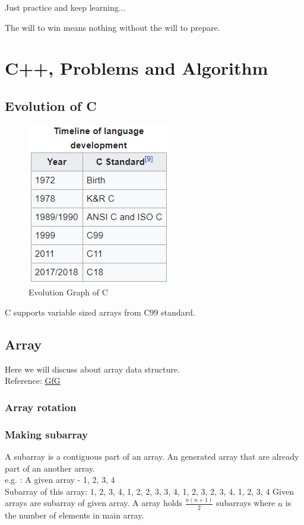\documentclass[11 pt]{book}
\begin{document}
\begin{tcolorbox}[width=7cm]
	Just practice and keep learning...
\end{tcolorbox}

\begin{flushright}
	\begin{tcolorbox}[title={Juma Ikangaa, marathoner}, colback=red!5!white, colframe=red!75!black, fonttitle=\bfseries]
		The will to win means nothing without the will to prepare.
	\end{tcolorbox}
\end{flushright}

\chapter{C++, Problems and Algorithm}
\section{Evolution of C}
\begin{figure}[hbtp]
\centering
\includegraphics[width=200 px]{Timeline of C language.png}
\caption{Evolution Graph of C}
\end{figure}
C supports variable sized arrays from C99 standard.

\section{Array}
Here we will discuss about array data structure.\\
Reference: \href{https://www.geeksforgeeks.org/array-data-structure/}{GfG}\\

\subsection{Array rotation}
\subsection{Making subarray}
A subarray is a contiguous part of an array. An generated array that are already part of an another array.\\
e.g. : A given array - {1, 2, 3, 4}\\
Subarray of this array:
{1}, {2}, {3}, {4}, {1, 2}, {2, 3}, {3, 4}, {1, 2, 3}, {2, 3, 4}, {1, 2, 3, 4}
Given arrays are subarray of given array. A array holds $\frac{n(n+1)}{2}$ subarrays where $n$ is the number of elements in main array.
\end{document}
